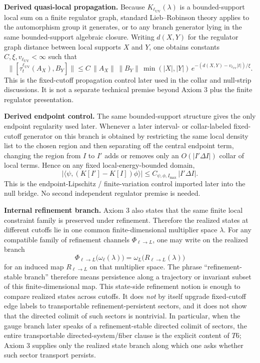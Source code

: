 \textbf{Derived quasi-local propagation.} Because \(K_{\ell_{\mathrm{UV}}}(\lambda)\) is a bounded-support local sum on a finite regulator graph, standard Lieb--Robinson theory applies to the automorphism group it generates, or to any branch generator lying in the same bounded-support algebraic closure. Writing \(d(X,Y)\) for the regulator graph distance between local supports \(X\) and \(Y\), one obtains constants \(C,\xi,v_{\ell_{\mathrm{UV}}}<\infty\) such that
\[
\bigl\|[\tau_t^{\ell_{\mathrm{UV}}}(A_X),B_Y]\bigr\|
\le
C\,\|A_X\|\,\|B_Y\|\,\min(|X|,|Y|)\,
e^{-(d(X,Y)-v_{\ell_{\mathrm{UV}}}|t|)/\xi}.
\]
This is the fixed-cutoff propagation control later used in the collar and null-strip discussions. It is not a separate technical premise beyond Axiom 3 plus the finite regulator presentation.

\textbf{Derived endpoint control.} The same bounded-support structure gives the only endpoint regularity used later. Whenever a later interval- or collar-labeled fixed-cutoff generator on this branch is obtained by restricting the same local density list to the chosen region and then separating off the central endpoint term, changing the region from \(I\) to \(I'\) adds or removes only an \(O(|I'\Delta I|)\) collar of local terms. Hence on any fixed local-energy-bounded domain,
\[
\left|\langle\psi,(K[I']-K[I])\phi\rangle\right|
\le
C_{\psi,\phi,I_{\max}}\,|I'\Delta I|.
\]
This is the endpoint-Lipschitz / finite-variation control imported later into the null bridge. No second independent regulator premise is needed.

\textbf{Internal refinement branch.} Axiom 3 also states that the same finite local constraint family is preserved under refinement. Therefore the realized states at different cutoffs lie in one common finite-dimensional multiplier space \(\lambda\). For any compatible family of refinement channels \(\Phi_{\ell\to L}\), one may write on the realized branch
\[
\Phi_{\ell\to L}\bigl(\omega_\ell(\lambda)\bigr)
=
\omega_L\!\bigl(R_{\ell\to L}(\lambda)\bigr)
\]
for an induced map \(R_{\ell\to L}\) on that multiplier space. The phrase ``refinement-stable branch'' therefore means persistence along a trajectory or invariant subset of this finite-dimensional map. This state-side refinement notion is enough to compare realized states across cutoffs. It does \emph{not} by itself upgrade fixed-cutoff edge labels to transportable refinement-persistent sectors, and it does not show that the directed colimit of such sectors is nontrivial. In particular, when the gauge branch later speaks of a refinement-stable directed colimit of sectors, the entire transportable directed-system/fiber clause is the explicit content of \(T6\); Axiom 3 supplies only the realized state branch along which one asks whether such sector transport persists.

